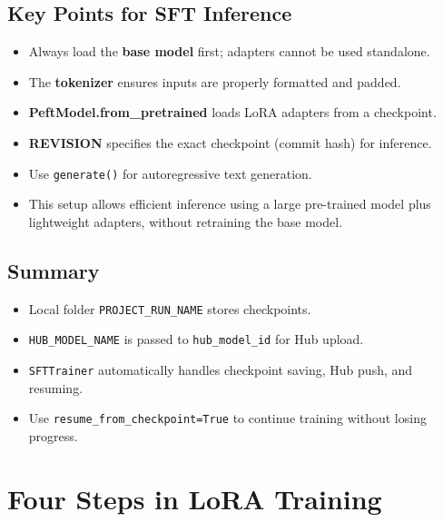 \subsection{Key Points for SFT Inference}
\begin{tcolorbox}[colback=blue!5!white, colframe=blue!80!black, title=\textbf{Important Notes}, 
                  coltitle=black, fonttitle=\bfseries, enhanced, sharp corners, boxrule=1pt]
\begin{itemize}
    \item Always load the \textbf{base model} first; adapters cannot be used standalone.
    \item The \textbf{tokenizer} ensures inputs are properly formatted and padded.
    \item \textbf{PeftModel.from\_pretrained} loads LoRA adapters from a checkpoint.
    \item \textbf{REVISION} specifies the exact checkpoint (commit hash) for inference.
    \item Use \texttt{generate()} for autoregressive text generation.
    \item This setup allows efficient inference using a large pre-trained model 
    plus lightweight adapters, without retraining the base model.
\end{itemize}
\end{tcolorbox}



\subsection{Summary}
\begin{tcolorbox}[colback=blue!5!white, colframe=blue!75!black, title=Key Points]
\begin{itemize}
    \item Local folder \texttt{PROJECT\_RUN\_NAME} stores checkpoints.
    \item \texttt{HUB\_MODEL\_NAME} is passed to \texttt{hub\_model\_id} for Hub upload.
    \item \texttt{SFTTrainer} automatically handles checkpoint saving, Hub push, and resuming.
    \item Use \texttt{resume\_from\_checkpoint=True} to continue training without losing progress.
\end{itemize}
\end{tcolorbox}



\newpage

\section{Four Steps in LoRA Training}

